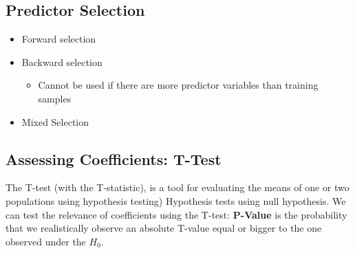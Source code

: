 \documentclass[../Main.tex]{subfiles}
\begin{document}
\subsection{Predictor Selection}
\begin{itemize}
    \item Forward selection
    \item Backward selection
    \begin{itemize}
        \item Cannot be used if there are more predictor variables than training samples
    \end{itemize}
    \item Mixed Selection
\end{itemize}

\subsection{Assessing Coefficients: T-Test}
The T-test (with the T-statistic), is a tool for evaluating the means of one or two populations using hypothesis testing) Hypothesis tests using null hypothesis. We can test the relevance of coefficients using the T-test:
\textbf{P-Value} is the probability that we realistically observe an absolute T-value equal or bigger to the one observed under the \(H_0\).
\end{document}

